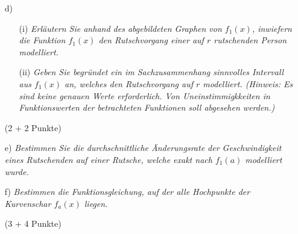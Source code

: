 \documentclass[ngerman, a4paper, 11pt]{article}
\begin{document}
\begin{figure}[h]
    \centering
\end{figure}

\begin{enumerate}
    \item[d)]
        \begin{enumerate}
            \item[(i)]
                \textit{Erläutern Sie anhand des abgebildeten Graphen von $f_{1}(x)$, inwiefern die Funktion $f_{1}(x)$ den Rutschvorgang einer auf $r$ rutschenden Person modelliert. }
            \item[(ii)]
                \textit{Geben Sie begründet ein im Sachzusammenhang sinnvolles Intervall aus $f_{1}(x)$ an, welches den Rutschvorgang auf $r$ modelliert. (Hinweis: Es sind keine genauen Werte erforderlich. Von Uneinstimmigkkeiten in Funktionswerten der betrachteten Funktionen soll abgesehen werden.)}
        \end{enumerate}
        \begin{flushright}
            (2 + 2 Punkte)
        \end{flushright}
\end{enumerate}

\begin{enumerate}
    \item[e)]
        \textit{Bestimmen Sie die durchschnittliche Änderungsrate der Geschwindigkeit eines Rutschenden auf einer Rutsche, welche exakt nach $f_{1}(a)$ modelliert wurde.}
    \item[f)]
        \textit{Bestimmen die Funktionsgleichung, auf der alle Hochpunkte der Kurvenschar $f_{a}(x)$ liegen.}
        \begin{flushright}
            (3 + 4 Punkte)
        \end{flushright}
\end{enumerate}


\end{document}
